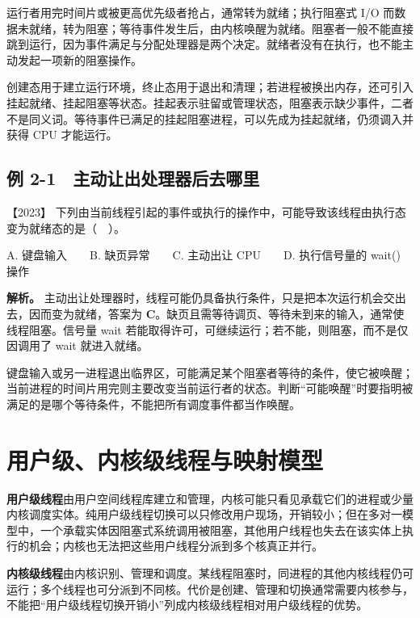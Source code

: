 运行者用完时间片或被更高优先级者抢占，通常转为就绪；执行阻塞式 I/O 而数据未就绪，转为阻塞；等待事件发生后，由内核唤醒为就绪。阻塞者一般不能直接跳到运行，因为事件满足与分配处理器是两个决定。就绪者没有在执行，也不能主动发起一项新的阻塞操作。

创建态用于建立运行环境，终止态用于退出和清理；若进程被换出内存，还可引入挂起就绪、挂起阻塞等状态。挂起表示驻留或管理状态，阻塞表示缺少事件，二者不是同义词。等待事件已满足的挂起阻塞进程，可以先成为挂起就绪，仍须调入并获得 CPU 才能运行。

\subsection{例 2-1　主动让出处理器后去哪里}\label{os-ex2-1}

\noindent{}【2023】 下列由当前线程引起的事件或执行的操作中，可能导致该线程由执行态变为就绪态的是（　）。

A. 键盘输入　　B. 缺页异常　　C. 主动出让 CPU　　D. 执行信号量的 wait() 操作


\textbf{解析。} 主动出让处理器时，线程可能仍具备执行条件，只是把本次运行机会交出去，因而变为就绪，答案为 \textbf{C}。缺页且需等待调页、等待未到来的输入，通常使线程阻塞。信号量 wait 若能取得许可，可继续运行；若不能，则阻塞，而不是仅因调用了 wait 就进入就绪。

键盘输入或另一进程退出临界区，可能满足某个阻塞者等待的条件，使它被唤醒；当前进程的时间片用完则主要改变当前运行者的状态。判断``可能唤醒''时要指明被满足的是哪个等待条件，不能把所有调度事件都当作唤醒。

\section{用户级、内核级线程与映射模型}\label{os-2-3}

\textbf{用户级线程}由用户空间线程库建立和管理，内核可能只看见承载它们的进程或少量内核调度实体。纯用户级线程切换可以只修改用户现场，开销较小；但在多对一模型中，一个承载实体因阻塞式系统调用被阻塞，其他用户线程也失去在该实体上执行的机会；内核也无法把这些用户线程分派到多个核真正并行。

\textbf{内核级线程}由内核识别、管理和调度。某线程阻塞时，同进程的其他内核线程仍可运行；多个线程也可分派到不同核。代价是创建、管理和切换通常需要内核参与，不能把``用户级线程切换开销小''列成内核级线程相对用户级线程的优势。


